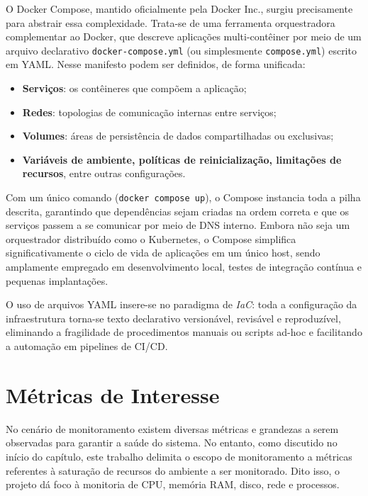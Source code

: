 O Docker Compose, mantido oficialmente pela Docker Inc., surgiu precisamente para abstrair essa complexidade. Trata-se de uma ferramenta orquestradora complementar ao Docker, que descreve aplicações multi-contêiner por meio de um arquivo declarativo \verb|docker-compose.yml| (ou simplesmente \verb|compose.yml|) escrito em YAML. Nesse manifesto podem ser definidos, de forma unificada:

\begin{itemize}
\item \textbf{Serviços}: os contêineres que compõem a aplicação;
\item \textbf{Redes}: topologias de comunicação internas entre serviços;
\item \textbf{Volumes}: áreas de persistência de dados compartilhadas ou exclusivas;
\item \textbf{Variáveis de ambiente, políticas de reinicialização, limitações de recursos}, entre outras configurações.
\end{itemize}

Com um único comando (\verb|docker compose up|), o Compose instancia toda a pilha descrita, garantindo que dependências sejam criadas na ordem correta e que os serviços passem a se comunicar por meio de DNS interno. Embora não seja um orquestrador distribuído como o Kubernetes, o Compose simplifica significativamente o ciclo de vida de aplicações em um único host, sendo amplamente empregado em desenvolvimento local, testes de integração contínua e pequenas implantações.

O uso de arquivos YAML insere-se no paradigma de \textit{IaC}: toda a configuração da infraestrutura torna-se texto declarativo versionável, revisável e reproduzível, eliminando a fragilidade de procedimentos manuais ou scripts ad-hoc e facilitando a automação em pipelines de CI/CD.


\section{Métricas de Interesse}
\label{section:Metricas}

No cenário de monitoramento existem diversas métricas e grandezas a serem observadas para garantir a saúde do sistema. No entanto, como discutido no início do capítulo, este trabalho delimita o escopo de monitoramento a métricas referentes à saturação de recursos do ambiente a ser monitorado. Dito isso, o projeto dá foco à monitoria de CPU, memória RAM, disco, rede e processos. 

